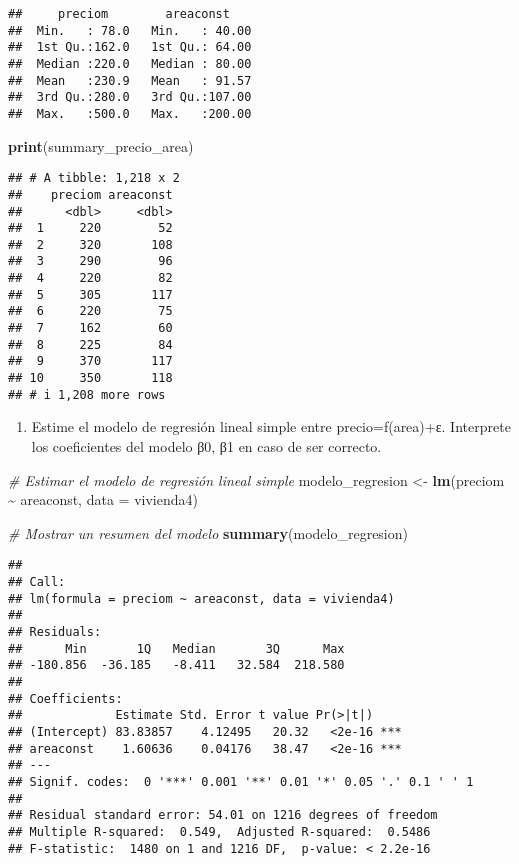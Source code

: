 \documentclass[
]{article}
\newenvironment{Shaded}{\begin{snugshade}}{\end{snugshade}}
\newcommand{\AttributeTok}[1]{\textcolor[rgb]{0.13,0.29,0.53}{#1}}
\newcommand{\CommentTok}[1]{\textcolor[rgb]{0.56,0.35,0.01}{\textit{#1}}}
\newcommand{\FunctionTok}[1]{\textcolor[rgb]{0.13,0.29,0.53}{\textbf{#1}}}
\newcommand{\NormalTok}[1]{#1}
\newcommand{\OtherTok}[1]{\textcolor[rgb]{0.56,0.35,0.01}{#1}}
\newcommand{\SpecialCharTok}[1]{\textcolor[rgb]{0.81,0.36,0.00}{\textbf{#1}}}
\providecommand{\tightlist}{%
  \setlength{\itemsep}{0pt}\setlength{\parskip}{0pt}}
\begin{document}
\begin{verbatim}
##     preciom        areaconst     
##  Min.   : 78.0   Min.   : 40.00  
##  1st Qu.:162.0   1st Qu.: 64.00  
##  Median :220.0   Median : 80.00  
##  Mean   :230.9   Mean   : 91.57  
##  3rd Qu.:280.0   3rd Qu.:107.00  
##  Max.   :500.0   Max.   :200.00
\end{verbatim}

\begin{Shaded}
\begin{Highlighting}[]
\FunctionTok{print}\NormalTok{(summary\_precio\_area)}
\end{Highlighting}
\end{Shaded}

\begin{verbatim}
## # A tibble: 1,218 x 2
##    preciom areaconst
##      <dbl>     <dbl>
##  1     220        52
##  2     320       108
##  3     290        96
##  4     220        82
##  5     305       117
##  6     220        75
##  7     162        60
##  8     225        84
##  9     370       117
## 10     350       118
## # i 1,208 more rows
\end{verbatim}

\begin{enumerate}
\def\labelenumi{\arabic{enumi}.}
\setcounter{enumi}{2}
\tightlist
\item
  Estime el modelo de regresión lineal simple entre precio=f(area)+ε.
  Interprete los coeficientes del modelo β0, β1 en caso de ser correcto.
\end{enumerate}

\begin{Shaded}
\begin{Highlighting}[]
\CommentTok{\# Estimar el modelo de regresión lineal simple}
\NormalTok{modelo\_regresion }\OtherTok{\textless{}{-}} \FunctionTok{lm}\NormalTok{(preciom }\SpecialCharTok{\textasciitilde{}}\NormalTok{ areaconst, }\AttributeTok{data =}\NormalTok{ vivienda4)}

\CommentTok{\# Mostrar un resumen del modelo}
\FunctionTok{summary}\NormalTok{(modelo\_regresion)}
\end{Highlighting}
\end{Shaded}

\begin{verbatim}
## 
## Call:
## lm(formula = preciom ~ areaconst, data = vivienda4)
## 
## Residuals:
##      Min       1Q   Median       3Q      Max 
## -180.856  -36.185   -8.411   32.584  218.580 
## 
## Coefficients:
##             Estimate Std. Error t value Pr(>|t|)    
## (Intercept) 83.83857    4.12495   20.32   <2e-16 ***
## areaconst    1.60636    0.04176   38.47   <2e-16 ***
## ---
## Signif. codes:  0 '***' 0.001 '**' 0.01 '*' 0.05 '.' 0.1 ' ' 1
## 
## Residual standard error: 54.01 on 1216 degrees of freedom
## Multiple R-squared:  0.549,  Adjusted R-squared:  0.5486 
## F-statistic:  1480 on 1 and 1216 DF,  p-value: < 2.2e-16
\end{verbatim}
\end{document}
